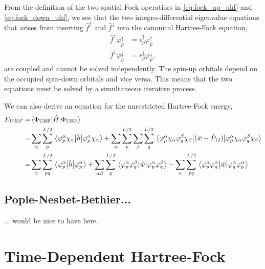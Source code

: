 From the definition of the two spatial Fock operatiors in \autoref{eq:fock_up_uhf} and 
\autoref{eq:fock_down_uhf},
we see that the two integro-differential eigenvalue equations that arises from inserting
$\hat{f}^\uparrow$ and $\hat{f}^\downarrow$ into the canonical Hartree-Fock equation,
\begin{align}
    \hat{f}^\uparrow \varphi_p^\uparrow &= \epsilon_p^\uparrow\varphi_p^\uparrow \\
    \hat{f}^\downarrow \varphi_p^\downarrow &= \epsilon_p^\downarrow\varphi_p^\downarrow,
\end{align}
are 
coupled and cannot be solved independently. The spin-up orbitals depend on the occupied spin-down 
orbitals and vice versa. This means that the two equations must be solved by a simultaneous 
iterative process.

We can also derive an equation for the unrestricted Hartree-Fock energy,
\begin{equation}
    \begin{aligned}
    E_{UHF} =& \mel{\Phi_{\text{UHF}}}{\hat{H}}{\Phi_{\text{UHF}}}\\
    =& \sum_\alpha\sum_p^{L/2} \mel{\varphi_p^\alpha\chi_\alpha}{\hat{h}}{\varphi_p^\alpha\chi_\alpha}
    + \sum_\alpha\sum_p^{L/2}\sum_\beta\sum_q^{L/2}
        \mel{\varphi_p^\alpha\chi_\alpha\varphi_q^\beta\chi_\beta}{(\hat{w} - \hat{P}_{12})}
            {\varphi_p^\alpha\chi_\alpha\varphi_q^\beta\chi_\beta} \\
    =& \sum_\alpha\sum_{pq}^{L/2} \mel{\varphi_p^\alpha}{\hat{h}}{\varphi_p^\alpha} 
    + \sum_{\alpha\beta}\sum_q^{L/2}
        \mel{\varphi_p^\alpha\varphi_q^\beta}{\hat{w}}{\varphi_p^\alpha\varphi_q^\beta} 
    - \sum_\alpha\sum_{pq}^{L/2}
        \mel{\varphi_p^\alpha\varphi_q^\alpha}{\hat{w}}{\varphi_q^\alpha\varphi_p^\alpha}
    \end{aligned}
\end{equation}


\subsection{Pople-Nesbet-Bethier...}
... would be nice to have here.

\section{Time-Dependent Hartree-Fock}

